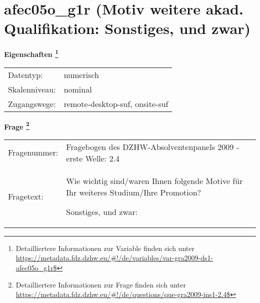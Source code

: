 
    \setcounter{footnote}{0}

    \vspace*{-1.8cm}
	\section{afec05o\_g1r (Motiv weitere akad. Qualifikation: Sonstiges, und zwar)}
	\label{section:afec05o_g1r}



    \vspace*{0.5cm}
    \noindent\textbf{Eigenschaften
	\footnote{Detailliertere Informationen zur Variable finden sich unter
		\url{https://metadata.fdz.dzhw.eu/\#!/de/variables/var-gra2009-ds1-afec05o_g1r$}}}\\
	\begin{tabularx}{\hsize}{@{}lX}
	Datentyp: & numerisch \\
	Skalenniveau: & nominal \\
	Zugangswege: &
	  remote-desktop-suf, 
	  onsite-suf
 \\
    \end{tabularx}



				\vspace*{0.5cm}
                \noindent\textbf{Frage
	                \footnote{Detailliertere Informationen zur Frage finden sich unter
		              \url{https://metadata.fdz.dzhw.eu/\#!/de/questions/que-gra2009-ins1-2.4$}}}\\
				\begin{tabularx}{\hsize}{@{}lX}
					Fragenummer: &
					  Fragebogen des DZHW-Absolventenpanels 2009 - erste Welle:
					  2.4
 \\
					Fragetext: & Wie wichtig sind/waren Ihnen folgende Motive für Ihr weiteres Studium/Ihre Promotion?\par  Sonstiges, und zwar: \\
				\end{tabularx}





